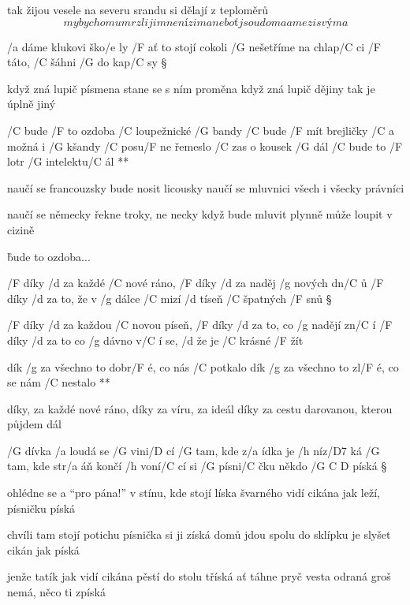 tak žijou vesele na severu
srandu si dělají z teploměrů
\[ my bychom umrzli jim není zima
neboť jsou doma a mezi svýma \]




/a dáme klukovi ško/e ly
/F ať to stojí cokoli
/G nešetříme na chlap/C ci
/F táto, /C šáhni /G do kap/C sy \S

když zná lupič písmena
stane se s ním proměna
když zná lupič dějiny
tak je úplně jiný

\R  /C bude /F to ozdoba /C loupežnické /G bandy
    /C bude /F mít brejličky /C a možná i /G kšandy
    /C posu/F ne řemeslo /C zas o kousek /G dál
    /C bude to /F lotr /G intelektu/C ál **

naučí se francouzsky
bude nosit licousky
naučí se mluvnici
všech i všecky právníci \s

naučí se německy
řekne troky, ne necky
když bude mluvit plynně
může loupit v cizině

\r bude to ozdoba...




/F díky /d za každé /C nové ráno, /F díky /d za naděj /g nových dn/C ů
/F díky /d za to, že v /g dálce /C mizí /d tíseň /C špatných /F snů \S

/F díky /d za každou /C novou píseň, /F díky /d za to, co /g nadějí zn/C í
/F díky /d za to co /g dávno v/C í se, /d že je /C krásné /F žít

\R dík /g za všechno to dobr/F é, co nás /C potkalo
   dík /g za všechno to zl/F é, co se nám /C nestalo **

díky, za každé nové ráno, díky za víru, za ideál
díky za cestu darovanou, kterou půjdem dál




/G dívka /a loudá se /G vini/D cí
/G tam, kde z/a ídka je /h níz/D7 ká
/G tam, kde str/a áň končí /h voní/C cí
si /G písni/C čku někdo /{G C D} píská \S

ohlédne se a ``pro pána!''
v stínu, kde stojí líska
švarného vidí cikána
jak leží, písničku píská \s

chvíli tam stojí potichu
písnička si ji získá
domů jdou spolu do sklípku
je slyšet cikán jak píská \s

jenže tatík jak vidí cikána
pěstí do stolu tříská
ať táhne pryč vesta odraná
groš nemá, něco ti zpíská \s


